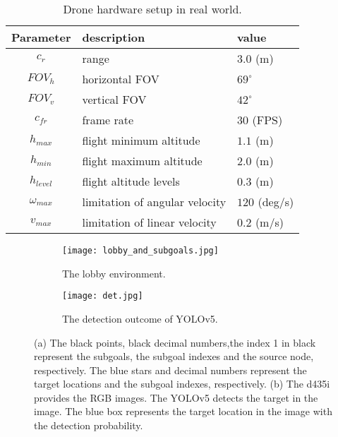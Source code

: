 \begin{table}[htbp]
   \caption{Drone hardware setup in real world.}
   \begin{center}
     \begin{tabular}{|| c | l | l ||}
     \hline
     Parameter & description & value\\ [0.5ex]
     \hline\hline
     $c_r$ & range & $3.0$ (m) \\
     \hline
     $FOV_h$ & horizontal FOV & $69^{\circ}$ \\
     \hline
     $FOV_v$ & vertical FOV & $42^{\circ}$ \\
     \hline
     $c_{fr}$ & frame rate & $30$ (FPS) \\
     \hline\hline
     $h_{max}$ & flight minimum altitude & $1.1$ (m) \\
     \hline
     $h_{min}$ & flight maximum altitude & $2.0$ (m) \\
     \hline
     $h_{level}$ & flight altitude levels & $0.3$ (m) \\
     \hline
     $\omega_{max}$ & limitation of angular velocity & $120$ (deg/s) \\
     \hline
     $v_{max}$ & limitation of linear velocity & $0.2$ (m/s) \\
     \hline
    \end{tabular}
   \end{center}
   \label{tab:drone_info_nx}
\end{table}


\begin{figure}[htbp]
  \centering
  \begin{subfigure}{.4\textwidth}
  \centering
  \texttt{[image: lobby\_and\_subgoals.jpg]}
  \caption{The lobby environment.}
\end{subfigure}
\begin{subfigure}{.4\textwidth}
  \centering
  \texttt{[image: det.jpg]}
  \caption{The detection outcome of YOLOv5.}
\end{subfigure}
  \caption{(a)
  The black points, black decimal numbers,the index 1 in black represent the subgoals, the subgoal indexes and the source node, respectively.
  The blue stars and decimal numbers represent the target locations and the subgoal indexes, respectively.
  (b) The d435i provides the RGB images. The YOLOv5 detects the target in the image. The blue box represents the target location in the image with the detection probability.
  }
  \label{fig:lobby}
\end{figure}

